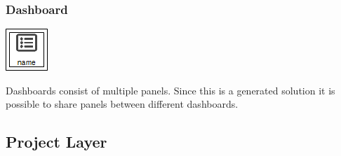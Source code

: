 \subsubsection{Dashboard}
\noindent\begin{minipage}{0.15\textwidth}%
\includegraphics[width=\linewidth]{assets/images/dashboard}
\end{minipage}%
\hfill%
\begin{minipage}{0.8\textwidth}
	Dashboards consist of multiple panels. Since this is a generated solution it is possible to share panels between different dashboards. 
\end{minipage}



\subsection{Project Layer}

